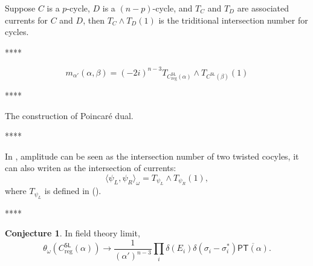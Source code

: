 \documentclass[11pt]{article}
\newcommand{\cc}{\mathbb{C}}
\theoremstyle{definition}
\newtheorem{conj}[para]{Conjecture}
\theoremstyle{plain}
\begin{document}
Suppose $C$ is a $p$-cycle, $D$ is a $(n-p)$-cycle, and $T_C$ and $T_D$
are associated currents for $C$ and $D$, then 
$T_C\wedge T_D(1)$ is the triditional intersection number 
for cycles.

****

\[
	m_{\alpha'}(\alpha,\beta)=\left(-2i\right)^{n-3}T_{C^{\mathsf{SL}}_{\text{reg}}(\alpha)}\wedge
	T_{C^{\mathsf{SL}}(\beta)}(1)
\]

****

The construction of Poincar\'e dual.

****

In \cite{mizera2018scattering}, amplitude can be seen as the intersection
number of two twisted cocyles, it can also writen as the intersection
of currents:
\[
	\langle \psi_L,\psi_R\rangle_\omega= T_{\psi_L}\wedge T_{\psi_R}(1),
\]
where $T_{\psi_L}$ is defined in (\theequation).

****

\begin{conj}
In field theory limit, 
\[
	\theta_\omega(C^{\mathsf{SL}}_{\text{reg}}(\alpha))\longrightarrow \frac{1}{(\alpha')^{n-3}}\prod_i \delta(E_i)\delta(\sigma_i-\sigma_i^*)\overline{\mathsf{PT}(\alpha)}.
\]
\end{conj}





\end{document}
